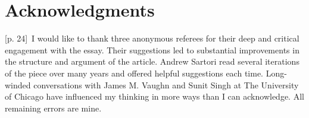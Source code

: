 \documentclass[10pt,a4paper]{article}
\begin{document}
\section*{Acknowledgments}
{\scriptsize\color{gray} [p. 24]}\ I would like to thank three anonymous referees for their deep and critical engagement with the essay. Their suggestions led to substantial improvements in the structure and argument of the article. Andrew Sartori read several iterations of the piece over many years and offered helpful suggestions each time. Long-winded conversations with James M. Vaughn and Sunit Singh at The University of Chicago have influenced my thinking in more ways than I can acknowledge. All remaining errors are mine.\par
\end{document}
